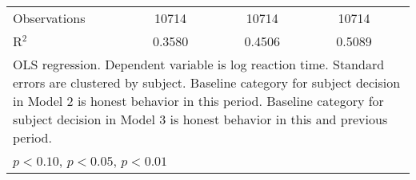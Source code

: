 {\begin{tabular}{l*{3}{cc}}
\hline
Observations    &    10714         &         &    10714         &         &    10714         &         \\
R$^2$      &       0.3580           &         &     0.4506      &         &    0.5089              &    \\ 
\hline\hline
\multicolumn{7}{l}{\footnotesize OLS regression. Dependent variable is log reaction time. Standard errors are clustered by subject. Baseline category for subject decision in Model 2 is honest behavior in this period. Baseline category for subject decision in Model 3 is honest behavior in this and previous period.}\\
\multicolumn{7}{l}{\footnotesize \sym{*} \(p<0.10\), \sym{**} \(p<0.05\), \sym{***} \(p<0.01\)}\\
\end{tabular}
}
